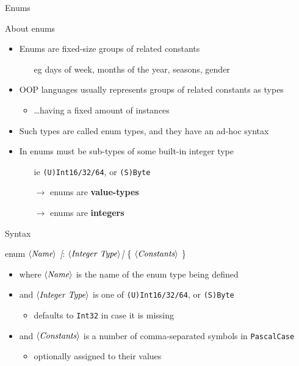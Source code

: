 \documentclass[presentation]{beamer}
\newcommand{\cscat}[1]{$\langle\text{{\itshape#1}}\rangle$}
\newcommand{\csopt}[1]{{\itshape[}#1{\itshape]}}
\begin{document}
\begin{frame}[allowframebreaks]{Enums}
  \begin{block}{About enums}
    \begin{itemize}
      \item Enums are fixed-size groups of related constants
      \begin{itemize}
        \item[eg] days of week, months of the year, seasons, gender  
      \end{itemize}

      \item OOP languages usually represents groups of related constants as types
      \begin{itemize}
        \item \ldots having a fixed amount of instances
      \end{itemize}

      \item Such types are called \alert{enum} types, and they have an ad-hoc syntax

      \item In \dotnet{} enums must be sub-types of some built-in integer type
      \begin{itemize}
        \item[ie] \texttt{(U)Int16/32/64}, or \texttt{(S)Byte}
        \item[$\rightarrow$] \dotnet enums are \textbf{value-types}
        \item[$\rightarrow$] \dotnet enums are \textbf{integers}
      \end{itemize}
    \end{itemize}
  \end{block}

  \begin{block}{Syntax}
    \begin{center}\ttfamily
      enum \cscat{Name} \csopt{: \cscat{Integer Type}} \{ \cscat{Constants} \}
    \end{center}
    \begin{itemize}
      \item where \texttt{\cscat{Name}} is the name of the enum type being defined
      \item and \texttt{\cscat{Integer Type}} is one of \texttt{(U)Int16/32/64}, or \texttt{(S)Byte}
      \begin{itemize}
        \item defaults to \texttt{Int32} in case it is missing
      \end{itemize}
      \item and \cscat{Constants} is a number of comma-separated symbols in \texttt{PascalCase}
      \begin{itemize}
        \item optionally assigned to their values
      \end{itemize}
    \end{itemize}
  \end{block}


\end{frame}
\end{document}
